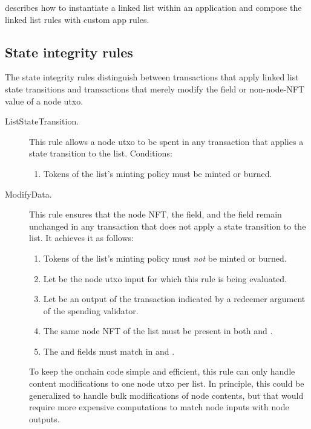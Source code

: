 \documentclass[../midgard.tex]{subfiles}
\begin{document}
 describes how to instantiate a linked list within an application and compose the linked list rules with custom app rules.

\subsection{State integrity rules}
\label{h:list-state-integrity-rules}

The state integrity rules distinguish between transactions that apply linked list state transitions and transactions that merely modify the  field or non-node-NFT value of a node utxo.

\begin{description}
    \item[ListStateTransition.]
    This rule allows a node utxo to be spent in any transaction that applies a state transition to the list.
    Conditions:
    \begin{enumerate}
        \item Tokens of the list's minting policy must be minted or burned.
    \end{enumerate}
    
    \item[ModifyData.]
    This rule ensures that the node NFT, the  field, and the  field remain unchanged in any transaction that does not apply a state transition to the list.
    It achieves it as follows:

    \begin{enumerate}
        \item Tokens of the list's minting policy must \emph{not} be minted or burned.
        \item Let  be the node utxo input for which this rule is being evaluated.
        \item Let  be an output of the transaction indicated by a redeemer argument of the spending validator.
        \item The same node NFT of the list must be present in both  and .
        \item The  and  fields must match in  and .
    \end{enumerate}
    
    To keep the onchain code simple and efficient, this rule can only handle content modifications to one node utxo per list.
    In principle, this could be generalized to handle bulk modifications of node contents, but that would require more expensive computations to match node inputs with node outputs.
\end{description}
\end{document}
